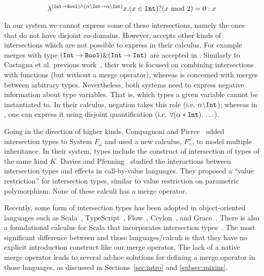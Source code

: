 \[
\lambda^{(\texttt{Int} \to \texttt{Bool}) \wedge (\alpha \backslash \texttt{Int} \to \alpha \backslash \texttt{Int})} 
x. (x \in \texttt{Int}) ? (x \text{ mod } 2) = 0 : x
\]

\noindent In our system we cannot express some of these intersections,
namely the ones that do not have disjoint co-domains.  However, \name
accepts other kinds of intersections which are not possible to express
in their calculus. For example merges with type $(\texttt{Int} \to \texttt{Bool})
\& (\texttt{Int} \to \texttt{Int})$ are accepted in \name.  Similarly to
Castagna et al. previous work~\cite{castagna1995calculus}, their work is
focused on combining intersections with functions (but without a merge
operator), whereas \name is concerned with merges between arbitrary
types.
Nevertheless, both systems need to express negative information about
type variables.
That is, which types a given variable cannot be instantiated to.
In their calculus, negation takes this role (i.e. $\alpha\backslash\texttt{Int}$); 
whereas in \name, one can express it using disjoint quantification 
(i.e. $\forall (\alpha * \texttt{Int}).\, \ldots$). 

Going in the direction of higher
kinds, Compagnoni and Pierce~\cite{comppier96} added
intersection types to System $ F_{\omega} $ and used a new calculus,
$ F^{\omega}_{\wedge} $, to model multiple inheritance. 
In their system, types include the construct of intersection of types of the
same kind $ K $. 
Davies and Pfenning~\cite{davies2000intersection} studied the interactions between
intersection types and effects in call-by-value languages. 
They proposed a ``value restriction'' for intersection types, similar to
value restriction on parametric polymorphism. None of these calculi
has a merge operator.

Recently, some form of intersection types has been adopted in
object-oriented languages such as Scala~\cite{scala-overview}, 
TypeScript~\cite{typescript}, Flow~\cite{flow}, Ceylon~\cite{ceylon}, and
Grace~\cite{black2012grace}.
There is also a foundational calculus for Scala
that incorporates intersection types~\cite{rompf2016soundness}.
The most significant difference between \name 
and those languages/calculi is that
they have no explicit introduction construct
like our merge operator.  The lack of a native merge operator
 leads to several ad-hoc solutions for
defining a merge operator in those languages, as discussed in
Sections~\ref{sec:intro} and \ref{subsec:mixins}.

